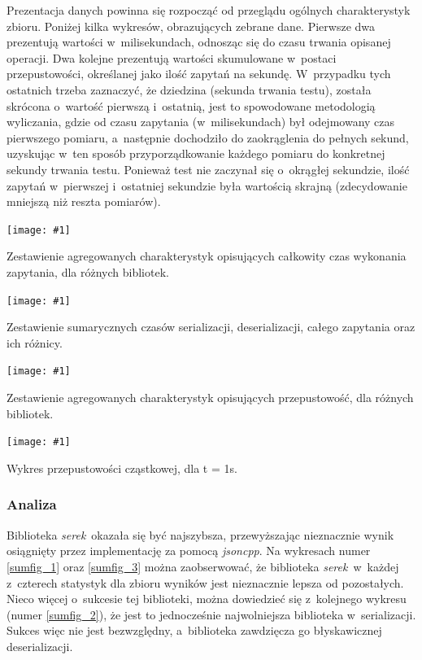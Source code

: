 \documentclass[12pt]{article}
\newcommand{\n}{\newline}
\newcommand{\putfig}[3]{
\begin{captioned}[H]
	\centering
	\texttt{[image: \#1]}
	\caption{#2}
	\label{#3}
	\medskip
\end{captioned}
}
\newcommand{\nonpl}[1]{{\it #1}}
\newcommand{\serek}{\nonpl{serek}}
\begin{document}
{{{				Prezentacja danych powinna się rozpocząć od przeglądu ogólnych charakterystyk zbioru. Poniżej kilka wykresów, obrazujących zebrane dane.
				Pierwsze dwa prezentują wartości w~milisekundach, odnosząc się do czasu trwania opisanej operacji. Dwa kolejne prezentują wartości skumulowane
				w~postaci przepustowości, określanej jako ilość zapytań na sekundę. W~przypadku tych ostatnich trzeba zaznaczyć, że dziedzina (sekunda trwania testu),
				została skrócona o~wartość pierwszą i~ostatnią, jest to spowodowane metodologią wyliczania, gdzie od czasu zapytania (w~milisekundach) był odejmowany
				czas pierwszego pomiaru, a~następnie dochodziło do zaokrąglenia do pełnych sekund, uzyskując w~ten sposób przyporządkowanie każdego pomiaru do konkretnej sekundy trwania testu.
				Ponieważ test nie zaczynał się o~okrągłej sekundzie, ilość zapytań w~pierwszej i~ostatniej sekundzie była wartością skrajną (zdecydowanie mniejszą niż reszta pomiarów).

				{
					\putfig{./charts/pre_generated_charts/total_request_time_per_library_summary.png}{
						Zestawienie agregowanych charakterystyk opisujących całkowity czas wykonania zapytania, dla różnych bibliotek.
					}{sumfig_1}
				}

				{
					\putfig{./charts/pre_generated_charts/total_serial_and_deserial_library_summmary.png}{
						Zestawienie sumarycznych czasów serializacji, deserializacji, całego zapytania oraz ich różnicy.
					}{sumfig_2}
				}

				{
					\putfig{./charts/pre_generated_charts/throughput_summary_per_library_summary.png}{
						Zestawienie agregowanych charakterystyk opisujących przepustowość, dla różnych bibliotek.
					}{sumfig_3}
				}

				{
					\putfig{./charts/output_with_charts_as_images/throughput_per_library.png}{ Wykres przepustowości cząstkowej, dla {\Delta t  = 1s}.}{sumfig_4}
				}
			}

			{
				\subsubsection{Analiza}

				Biblioteka \serek~okazała się być najszybsza, przewyższając nieznacznie wynik osiągnięty przez implementację za pomocą \nonpl{jsoncpp}. Na wykresach numer \ref{sumfig_1} oraz \ref{sumfig_3}
				można zaobserwować, że biblioteka \serek~w~każdej z~czterech statystyk dla zbioru wyników jest nieznacznie lepsza od pozostałych. Nieco więcej o~sukcesie tej biblioteki,
				można dowiedzieć się z~kolejnego wykresu (numer \ref{sumfig_2}), że jest to jednocześnie najwolniejsza biblioteka w~serializacji.
				Sukces więc nie jest bezwzględny, a~biblioteka zawdzięcza go błyskawicznej deserializacji.\n

}}}
\end{document}
